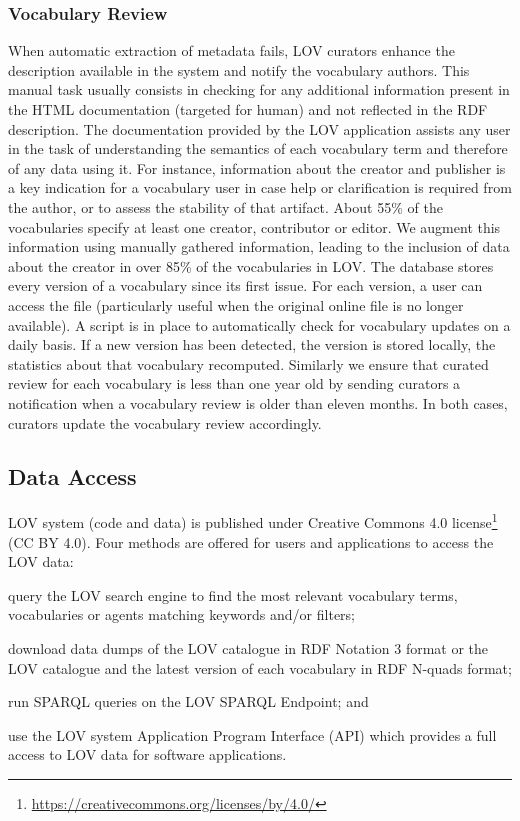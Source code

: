 \documentclass{iosart2c}
\begin{document}
	\subsubsection{Vocabulary Review}
When automatic extraction of metadata fails, LOV curators enhance the description available in the system and notify the vocabulary authors. This manual task usually consists in checking for any additional information present in the HTML documentation (targeted for human) and not reflected in the RDF description. The documentation provided by the LOV application assists any user in the task of understanding the semantics of each vocabulary term and therefore of any data using it. For instance, information about the creator and publisher is a key indication for a vocabulary user in case help or clarification is required from the author, or to assess the stability of that artifact. About 55\% of the vocabularies specify at least one creator, contributor or editor. We augment this information using manually gathered information, leading to the inclusion of data about the creator in over 85\% of the vocabularies in LOV. The database stores every version of a vocabulary since its first issue. For each version, a user can access the file (particularly useful when the original online file is no longer available). A script is in place to automatically check for vocabulary updates on a daily basis. If a new version has been detected, the version is stored locally, the statistics about that vocabulary recomputed. Similarly we ensure that curated review for each vocabulary is less than one year old by sending curators a notification when a vocabulary review is older than eleven months. In both cases, curators update the vocabulary review accordingly. 


\subsection{Data Access}

LOV system (code and data) is published under Creative Commons 4.0 license\footnote{\url{https://creativecommons.org/licenses/by/4.0/}} (CC BY 4.0). Four methods are offered for users and applications to access the LOV data:
		\begin{inparaenum}[1)] 
			\item query the LOV search engine to find the most relevant vocabulary terms, vocabularies or agents matching keywords and/or filters;
			\item download data dumps of the LOV catalogue in RDF Notation 3 format or the LOV catalogue and the latest version of each vocabulary in RDF N-quads format;
			\item run SPARQL queries on the LOV SPARQL Endpoint; and
			\item use the LOV system Application Program Interface (API) which provides a full access to LOV data for software applications.
		\end{inparaenum}
\end{document}

